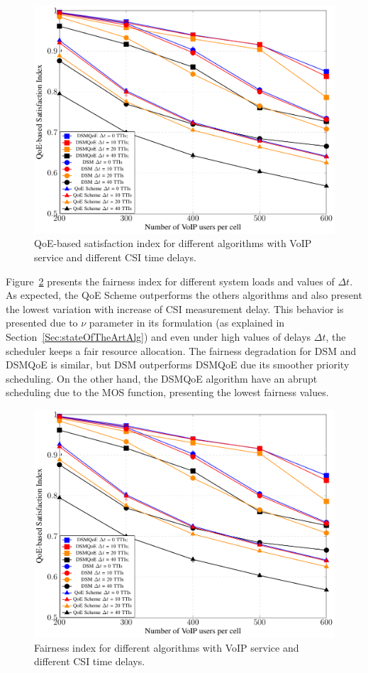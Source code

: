 \documentclass[conference]{IEEEtran}
\newcommand{\FigRef}[1]{Figure~\ref{#1}}
\newcommand{\SecRef}[1]{Section~\ref{#1}}
\begin{document}
\begin{figure}
	\centering
	\includegraphics[width=0.55\linewidth,page=1]{figs_wp2/figs_BRUNO_PEDRO/plotsCSI}
	\caption{QoE-based satisfaction index for different algorithms with VoIP service and different CSI time delays.}   
	\label{Fig:SatisfactionRTCSI}
\end{figure}

\FigRef{Fig:FairnessRTCSI} presents the fairness index for different system loads and values of $\Delta t$. As expected, the \ac{QoE} Scheme outperforms the others algorithms and also present the lowest variation with increase of \ac{CSI} measurement delay. This behavior is presented due to $\nu$ parameter in its formulation (as explained in \SecRef{Sec:stateOfTheArtAlg}) and even under high values of delays $\Delta t$, the scheduler keeps a fair resource allocation. The fairness degradation for DSM and DSMQoE is similar, but DSM outperforms DSMQoE due its smoother priority scheduling. On the other hand, the DSMQoE algorithm have an abrupt scheduling due to the MOS function, presenting the lowest fairness values. 

\begin{figure}
	\centering
	\includegraphics[width=0.55\linewidth,page=2]{figs_wp2/figs_BRUNO_PEDRO/plotsCSI}
	\caption{Fairness index for different algorithms with VoIP service and different CSI time delays.}
	\label{Fig:FairnessRTCSI}
\end{figure}
\end{document}

